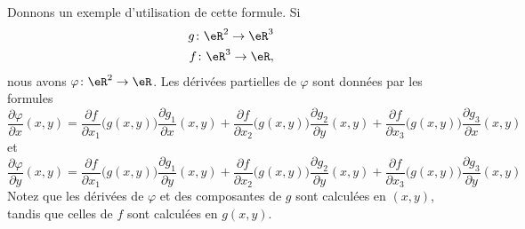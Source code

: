 Donnons un exemple d'utilisation de cette formule. Si
\begin{equation}
	\begin{aligned}[]
		g\colon \eR^2\to \eR^3\\
		f\colon \eR^3\to \eR,
	\end{aligned}
\end{equation}
nous avons $\varphi\colon \eR^2\to \eR$. Les dérivées partielles de $\varphi$ sont données par les formules
\begin{equation}
	\frac{ \partial \varphi }{ \partial x }(x,y)=\frac{ \partial f }{ \partial x_1 }\big( g(x,y) \big)\frac{ \partial g_1 }{ \partial x }(x,y)+\frac{ \partial f }{ \partial x_2 }\big( g(x,y) \big)\frac{ \partial g_2 }{ \partial y }(x,y)+\frac{ \partial f }{ \partial x_3 }\big( g(x,y) \big)\frac{ \partial g_3 }{ \partial x }(x,y)
\end{equation}
et
\begin{equation}
	\frac{ \partial \varphi }{ \partial y }(x,y)=\frac{ \partial f }{ \partial x_1 }\big( g(x,y) \big)\frac{ \partial g_1 }{ \partial y }(x,y)+\frac{ \partial f }{ \partial x_2 }\big( g(x,y) \big)\frac{ \partial g_2 }{ \partial y }(x,y)+\frac{ \partial f }{ \partial x_3 }\big( g(x,y) \big)\frac{ \partial g_3 }{ \partial y }(x,y)
\end{equation}
Notez que les dérivées de $\varphi$ et des composantes de $g$ sont calculées en $(x,y)$, tandis que celles de $f$ sont calculées en $g(x,y)$.
